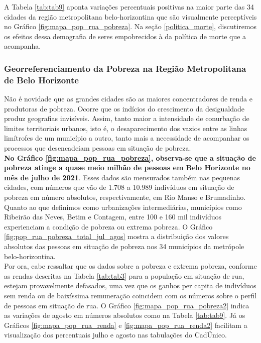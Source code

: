 \documentclass[12pt]{article}
\begin{document}
A Tabela \ref{tab:tab9} aponta variações percentuais positivas na maior parte das 34 cidades da região metropolitana belo-horizontina que são visualmente perceptíveis no Gráfico \ref{fig:mapa_pop_rua_pobreza}. Na seção \ref{politica_morte}, discutiremos os efeitos dessa demografia de seres empobrecidos à da política de morte que a acompanha.\\

\subsubsection{Georreferenciamento da Pobreza na Região Metropolitana de Belo Horizonte}
\label{pobreza_metropolitana2}

Não é novidade que as grandes cidades são as maiores concentradores de renda e produtoras de pobreza. Ocorre que os indícios do crescimento da desigualdade produz geografias invisíveis. Assim, tanto maior a intensidade de conurbação de limites territoriais urbanos, isto é, o desaparecimento dos vazios entre as linhas limítrofes de um município a outro, tanto mais a necessidade de acompanhar os processos que desencadeiam pessoas em situação de pobreza.\\ 

\textbf{No Gráfico \ref{fig:mapa_pop_rua_pobreza}, observa-se que a situação de pobreza atinge a quase meio milhão de pessoas em Belo Horizonte no mês de julho de 2021}. Esses dados são mensurados também nas pequenas cidades, com números que vão de 1.708 a 10.989 indivíduos em situação de pobreza em número absolutos, respectivamente, em Rio Manso e Brumadinho.\\ 

Quanto ao que definimos como urbanizações intermediárias, municípios como Ribeirão das Neves, Betim e Contagem, entre 100 e 160 mil indivíduos experienciam a condição de pobreza ou extrema pobreza. O Gráfico \ref{fig:pop_rua_pobreza_total_jul_agos} mostra a distribuição dos valores absolutos das pessoas em situação de pobreza nos 34 municípios da metrópole belo-horizontina.\\

Por ora, cabe ressaltar que os dados sobre a pobreza e extrema pobreza, conforme as rendas descritas na Tabela \ref{tab:tab3} para a população em situação de rua, estejam provavelmente defasados, uma vez que os ganhos per capita de indivíduos sem  renda ou de baixíssima remuneração coincidem com os números sobre o perfil de pessoas em situação de rua. O Gráfico \ref{fig:mapa_pop_rua_pobreza2} indica as variações de agosto em números absolutos como na Tabela \ref{tab:tab9}. Já os Gráficos \ref{fig:mapa_pop_rua_renda} e \ref{fig:mapa_pop_rua_renda2} facilitam a visualização dos percentuais julho e agosto nas tabulações do CadÚnico.\\
\end{document}
